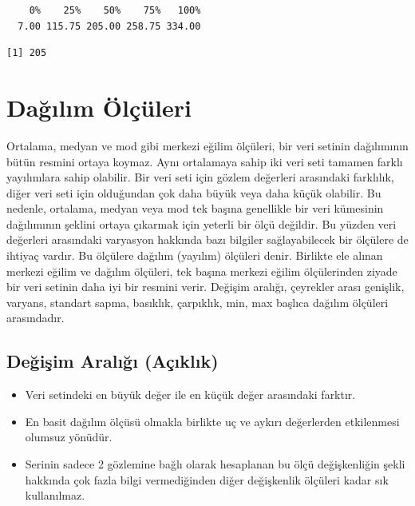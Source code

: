\documentclass[
  letterpaper,
  DIV=11,
  numbers=noendperiod]{scrreprt}
\newenvironment{Shaded}{\begin{snugshade}}{\end{snugshade}}
\newcommand{\AttributeTok}[1]{\textcolor[rgb]{0.40,0.45,0.13}{#1}}
\newcommand{\ConstantTok}[1]{\textcolor[rgb]{0.56,0.35,0.01}{#1}}
\newcommand{\FunctionTok}[1]{\textcolor[rgb]{0.28,0.35,0.67}{#1}}
\newcommand{\NormalTok}[1]{\textcolor[rgb]{0.00,0.23,0.31}{#1}}
\newcommand{\SpecialCharTok}[1]{\textcolor[rgb]{0.37,0.37,0.37}{#1}}
\begin{document}
\begin{verbatim}
    0%    25%    50%    75%   100% 
  7.00 115.75 205.00 258.75 334.00 
\end{verbatim}

\begin{Shaded}
\end{Shaded}

\begin{verbatim}
[1] 205
\end{verbatim}

\section*{Dağılım Ölçüleri}\label{daux11fux131lux131m-uxf6luxe7uxfcleri}


Ortalama, medyan ve mod gibi merkezi eğilim ölçüleri, bir veri setinin
dağılımının bütün resmini ortaya koymaz. Aynı ortalamaya sahip iki veri
seti tamamen farklı yayılımlara sahip olabilir. Bir veri seti için
gözlem değerleri arasındaki farklılık, diğer veri seti için olduğundan
çok daha büyük veya daha küçük olabilir. Bu nedenle, ortalama, medyan
veya mod tek başına genellikle bir veri kümesinin dağılımının şeklini
ortaya çıkarmak için yeterli bir ölçü değildir. Bu yüzden veri değerleri
arasındaki varyasyon hakkında bazı bilgiler sağlayabilecek bir ölçülere
de ihtiyaç vardır. Bu ölçülere dağılım (yayılım) ölçüleri denir.
Birlikte ele alınan merkezi eğilim ve dağılım ölçüleri, tek başına
merkezi eğilim ölçülerinden ziyade bir veri setinin daha iyi bir resmini
verir. Değişim aralığı, çeyrekler arası genişlik, varyans, standart
sapma, basıklık, çarpıklık, min, max başlıca dağılım ölçüleri
arasındadır.

\subsection*{Değişim Aralığı
(Açıklık)}\label{deux11fiux15fim-aralux131ux11fux131-auxe7ux131klux131k}

\begin{itemize}
\item
  Veri setindeki en büyük değer ile en küçük değer arasındaki farktır.
\item
  En basit dağılım ölçüsü olmakla birlikte uç ve aykırı değerlerden
  etkilenmesi olumsuz yönüdür.
\item
  Serinin sadece 2 gözlemine bağlı olarak hesaplanan bu ölçü
  değişkenliğin şekli hakkında çok fazla bilgi vermediğinden diğer
  değişkenlik ölçüleri kadar sık kullanılmaz.
\end{itemize}
\end{document}
